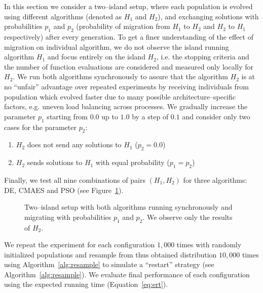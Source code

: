 \documentclass{sig-alternate}
\begin{document}
In this section we consider a two--island setup, where each population is evolved using different algorithms (denoted as $H_1$ and $H_2$), and exchanging solutions with probabilities $p_1$ and $p_2$ (probability of migration from $H_1$ to $H_2$ and $H_2$ to $H_1$ respectively) after every generation.
To get a finer understanding of the effect of migration on individual algorithm, we do not observe the island running algorithm $H_1$ and focus entirely on the island $H_2$, i.e. the stopping criteria and the number of function evaluations are considered and measured only locally for $H_2$.
We run both algorithms synchronously to assure that the algorithm $H_2$ is at no  ``unfair'' advantage over repeated experiments by receiving individuals from population which evolved faster due to many possible architecture--specific factors, e.g. uneven load balancing across processes.
We gradually increase the parameter $p_1$ starting from $0.0$ up to $1.0$ by a step of $0.1$ and consider only two cases for the parameter $p_2$: 
\begin{enumerate}
    \item $H_2$ does not send any solutions to $H_1$ ($p_2 = 0.0$)
    \item $H_2$ sends solutions to $H_1$ with equal probability ($p_1 = p_2$)
\end{enumerate}
Finally, we test all nine combinations of pairs $(H_1, H_2)$ for three algorithms: DE, CMAES and PSO (see Figure~\ref{graph:twoisl}).
\begin{figure}[ht!]
    \label{graph:twoisl}
    \caption{Two--island setup with both algorithms running synchronously and migrating with probabilities $p_1$ and $p_2$. We observe only the results of $H_2$.}

\end{figure}
We repeat the experiment for each configuration $1,000$ times with randomly initialized populations and resample from thus obtained distribution $10,000$ times using Algorithm~\ref{alg:resample} to simulate a ``restart'' strategy (see Algorithm~\ref{alg:resample}).
We evaluate final performance of each configuration using the expected running time (Equation~\ref{eq:ert}).
\end{document}
